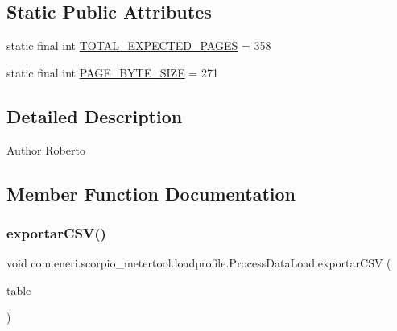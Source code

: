 \subsection*{Static Public Attributes}
\begin{DoxyCompactItemize}
\item 
static final int \hyperlink{classcom_1_1eneri_1_1scorpio__metertool_1_1loadprofile_1_1_process_data_load_a20aaf44dccd749bc9e826d900d4076f8}{T\+O\+T\+A\+L\+\_\+\+E\+X\+P\+E\+C\+T\+E\+D\+\_\+\+P\+A\+G\+ES} = 358
\item 
static final int \hyperlink{classcom_1_1eneri_1_1scorpio__metertool_1_1loadprofile_1_1_process_data_load_a3ecec14a88e4506d69d6147e485cecbb}{P\+A\+G\+E\+\_\+\+B\+Y\+T\+E\+\_\+\+S\+I\+ZE} = 271
\end{DoxyCompactItemize}


\subsection{Detailed Description}
\begin{DoxyAuthor}{Author}
Roberto 
\end{DoxyAuthor}


\subsection{Member Function Documentation}
\mbox{\label{classcom_1_1eneri_1_1scorpio__metertool_1_1loadprofile_1_1_process_data_load_aacb54542b58e1d1fef11e992acb588b6}} 
\subsubsection{\texorpdfstring{exportar\+C\+S\+V()}{exportarCSV()}}
{\footnotesize\ttfamily void com.\+eneri.\+scorpio\+\_\+metertool.\+loadprofile.\+Process\+Data\+Load.\+exportar\+C\+SV (\begin{DoxyParamCaption}\item[{J\+Table}]{table }\end{DoxyParamCaption})}

